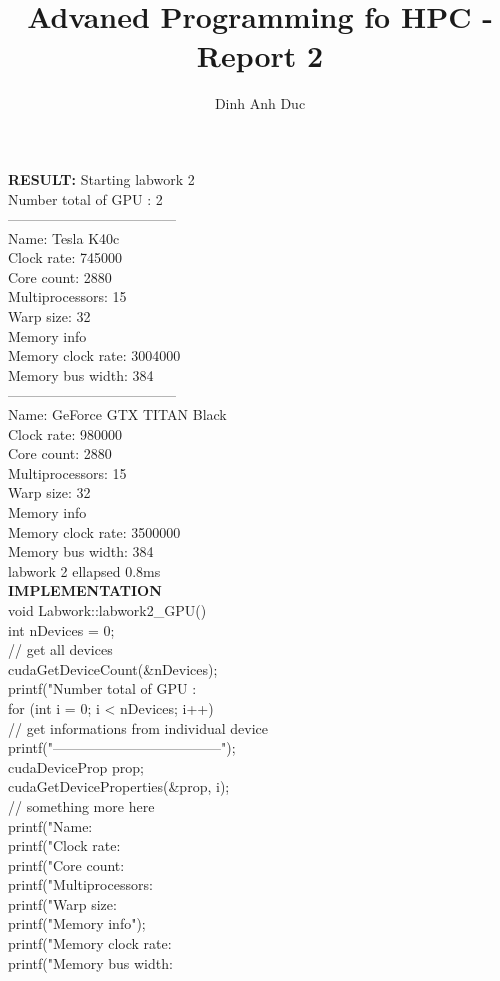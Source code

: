 \documentclass[10pt, a4paper]{article}
\title{Advaned Programming fo HPC - Report 2}
\author{Dinh Anh Duc}
\begin{document}
\maketitle

\textbf{RESULT:}
Starting labwork 2
\\
Number total of GPU : 2
\\
------------------------------------
\\
Name: Tesla K40c
\\
Clock rate: 745000
\\
Core count: 2880
\\
Multiprocessors: 15
\\
Warp size: 32
\\
Memory info
\\
Memory clock rate: 3004000
\\
Memory bus width: 384
\\
------------------------------------
\\
Name: GeForce GTX TITAN Black
\\
Clock rate: 980000
\\
Core count: 2880
\\
Multiprocessors: 15
\\
Warp size: 32
\\
Memory info
\\
Memory clock rate: 3500000
\\
Memory bus width: 384
\\
labwork 2 ellapsed 0.8ms
\\
\textbf{IMPLEMENTATION}
\\
void Labwork::labwork2_GPU() {
\\
    int nDevices = 0;
\\
    // get all devices
\\
    cudaGetDeviceCount(&nDevices);
\\
    printf("Number total of GPU : %
\\
    for (int i = 0; i < nDevices; i++){
\\
        // get informations from individual device
\\
        printf("------------------------------------\n");
\\
        cudaDeviceProp prop;
\\
        cudaGetDeviceProperties(&prop, i);
\\
        // something more here
\\
        printf("Name: %
\\
        printf("Clock rate: %
\\
        printf("Core count: %
\\
        printf("Multiprocessors: %
\\
        printf("Warp size: %
\\
        printf("Memory info\n");
\\
        printf("Memory clock rate: %
\\
        printf("Memory bus width: %
\\
    }
\\
}
\end{document}

